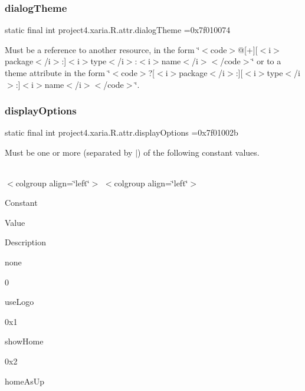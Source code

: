 \subsubsection{\texorpdfstring{dialog\+Theme}{dialogTheme}}
{\footnotesize\ttfamily static final int project4.\+xaria.\+R.\+attr.\+dialog\+Theme =0x7f010074\hspace{0.3cm}{\ttfamily [static]}}

Must be a reference to another resource, in the form \char`\"{}$<$code$>$@\mbox{[}+\mbox{]}\mbox{[}$<$i$>$package$<$/i$>$\+:\mbox{]}$<$i$>$type$<$/i$>$\+:$<$i$>$name$<$/i$>$$<$/code$>$\char`\"{} or to a theme attribute in the form \char`\"{}$<$code$>$?\mbox{[}$<$i$>$package$<$/i$>$\+:\mbox{]}\mbox{[}$<$i$>$type$<$/i$>$\+:\mbox{]}$<$i$>$name$<$/i$>$$<$/code$>$\char`\"{}. \mbox{\label{classproject4_1_1xaria_1_1R_1_1attr_a50707f742dca3b2c00f5db60fc71f8cb}} 
\subsubsection{\texorpdfstring{display\+Options}{displayOptions}}
{\footnotesize\ttfamily static final int project4.\+xaria.\+R.\+attr.\+display\+Options =0x7f01002b\hspace{0.3cm}{\ttfamily [static]}}

Must be one or more (separated by \textquotesingle{}$\vert$\textquotesingle{}) of the following constant values.

\tabulinesep=1mm
\begin{longtabu} spread 0pt [c]{*{0}{|X[-1]}|}
\hline
\end{longtabu}
$<$colgroup align=\char`\"{}left\char`\"{}$>$ $<$colgroup align=\char`\"{}left\char`\"{}$>$ 

Constant

Value

Description 

{\ttfamily none}

0

{\ttfamily use\+Logo}

0x1

{\ttfamily show\+Home}

0x2

{\ttfamily home\+As\+Up}

